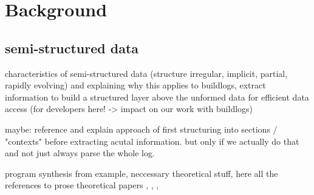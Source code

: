 \documentclass[\myrootdir/main.tex]{subfiles}
\begin{document}
\chapter{Background}

\section{semi-structured data}
characteristics of semi-structured data (structure irregular, implicit, partial, rapidly evolving) and explaining why this applies to buildlogs, extract information to build a structured layer above the unformed data for efficient data access (for developers here! -> impact on our work with buildlogs) \cite{abiteboul1997querying}

maybe: reference \cite{smith1997information} and explain approach of first structuring into sections / "contexts" before extracting acutal information. but only if we actually do that and not just always parse the whole log.

program synthesis from example, neccessary theoretical stuff,
here all the references to prose theoretical papers \cite{le2014flashextract:}, \cite{polozov2015flashmeta:}, \cite{mitchell1982generalization}, 
\end{document}

